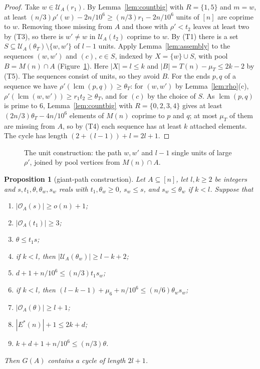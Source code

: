 \documentclass[11pt,a4paper]{article}
\newtheorem{proposition}[theorem]{Proposition}
\theoremstyle{definition}
\theoremstyle{remark}
\DeclareMathOperator{\lcm}{lcm}
\newcommand{\Es}{E^{*}}
\newcommand{\OA}{\mathcal{O}_A}
\newcommand{\UA}{\mathcal{U}_A}
\begin{document}
\begin{proof}
Take $w\in\UA(r_1)$. By Lemma~\ref{lem:countbig} with $R=\{1,5\}$ and $m=w$, at least
$(n/3)\rho'(w)-2n/10^6\ge(n/3)r_1-2n/10^6$ units of $[n]$ are coprime to $w$. Removing those missing
from $A$ and those with $\rho'<t_2$ leaves at least two by (T3), so there is $w'\ne w$ in $\UA(t_2)$
coprime to $w$. By (T1) there is a set $S\subseteq\UA(\theta_T)\setminus\{w,w'\}$ of $l-1$ units.
Apply Lemma~\ref{lem:assembly} to the sequences $(w,w')$ and $(c)$, $c\in S$, indexed by
$X=\{w\}\cup S$, with pool $B=M(n)\cap A$ (Figure~\ref{fig:unit}). Here $|X|=l\le k$ and
$|B|=T(n)-\mu_T\le2k-2$ by (T5). The sequences consist of units, so they avoid $B$. For the ends
$p,q$ of a sequence we have $\rho'(\lcm(p,q))\ge\theta_T$: for $(w,w')$ by Lemma~\ref{lem:rho}(c),
$\rho'(\lcm(w,w'))\ge r_1t_2\ge\theta_T$, and for $(c)$ by the choice of $S$. As $\lcm(p,q)$ is prime
to $6$, Lemma~\ref{lem:countbig} with $R=\{0,2,3,4\}$ gives at least $(2n/3)\theta_T-4n/10^6$
elements of $M(n)$ coprime to $p$ and $q$; at most $\mu_T$ of them are missing from $A$, so by (T4)
each sequence has at least $k$ attached elements. The cycle has length $(2+(l-1))+l=2l+1$.
\end{proof}

\begin{figure}[t]
\centering

\caption{The unit construction: the path $w,w'$ and $l-1$ single units of large $\rho'$, joined by
pool vertices from $M(n)\cap A$.}
\label{fig:unit}
\end{figure}

\begin{proposition}[giant-path construction]\label{prop:gp}
Let $A\subseteq[n]$, let $l,k\ge2$ be integers and $s,t_1,\theta,\theta_w,s_w$ reals with
$t_1,\theta_w\ge0$, $s_w\le s$, and $s_w\le\theta_w$ if $k<l$. Suppose that
\begin{enumerate}[label=(H\arabic*), nosep]
\item $|\OA(s)|\ge o(n)+1$;
\item $|\OA(t_1)|\ge3$;
\item $\theta\le t_1s$;
\item if $k<l$, then $|\UA(\theta_w)|\ge l-k+2$;
\item $d+1+n/10^6\le(n/3)t_1s_w$;
\item if $k<l$, then $(l-k-1)+\mu_6+n/10^6\le(n/6)\theta_ws_w$;
\item $|\OA(\theta)|\ge l+1$;
\item $|\Es(n)|+1\le2k+d$;
\item $k+d+1+n/10^6\le(n/3)\theta$.
\end{enumerate}
Then $G(A)$ contains a cycle of length $2l+1$.
\end{proposition}
\end{document}
